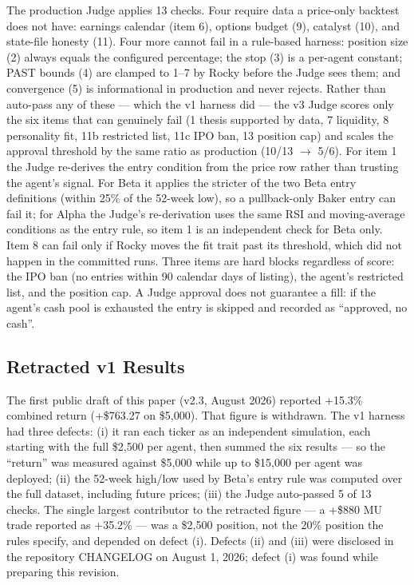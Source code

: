 \documentclass[11pt]{article}
\begin{document}
The production Judge applies 13 checks. Four require data a price-only backtest does not have: earnings calendar (item 6), options budget (9), catalyst (10), and state-file honesty (11). Four more cannot fail in a rule-based harness: position size (2) always equals the configured percentage; the stop (3) is a per-agent constant; PAST bounds (4) are clamped to 1--7 by Rocky before the Judge sees them; and convergence (5) is informational in production and never rejects. Rather than auto-pass any of these --- which the v1 harness did --- the v3 Judge scores only the six items that can genuinely fail (1 thesis supported by data, 7 liquidity, 8 personality fit, 11b restricted list, 11c IPO ban, 13 position cap) and scales the approval threshold by the same ratio as production (10/13 $\rightarrow$ 5/6). For item 1 the Judge re-derives the entry condition from the price row rather than trusting the agent's signal. For Beta it applies the stricter of the two Beta entry definitions (within 25\% of the 52-week low), so a pullback-only Baker entry can fail it; for Alpha the Judge's re-derivation uses the same RSI and moving-average conditions as the entry rule, so item 1 is an independent check for Beta only. Item 8 can fail only if Rocky moves the fit trait past its threshold, which did not happen in the committed runs. Three items are hard blocks regardless of score: the IPO ban (no entries within 90 calendar days of listing), the agent's restricted list, and the position cap. A Judge approval does not guarantee a fill: if the agent's cash pool is exhausted the entry is skipped and recorded as ``approved, no cash''.

\subsection{Retracted v1 Results}\label{retracted-v1-results}

The first public draft of this paper (v2.3, August 2026) reported +15.3\% combined return (+\$763.27 on \$5,000). That figure is withdrawn. The v1 harness had three defects: (i) it ran each ticker as an independent simulation, each starting with the full \$2,500 per agent, then summed the six results --- so the ``return'' was measured against \$5,000 while up to \$15,000 per agent was deployed; (ii) the 52-week high/low used by Beta's entry rule was computed over the full dataset, including future prices; (iii) the Judge auto-passed 5 of 13 checks. The single largest contributor to the retracted figure --- a +\$880 MU trade reported as +35.2\% --- was a \$2,500 position, not the 20\% position the rules specify, and depended on defect (i). Defects (ii) and (iii) were disclosed in the repository CHANGELOG on August 1, 2026; defect (i) was found while preparing this revision.
\end{document}

